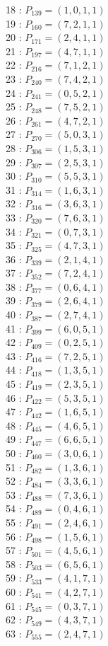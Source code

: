 \documentclass{article}
\begin{document}
{\begin{multicols}{2}
18 : $P_{139}=( 1, 0, 1, 1 )$\\
19 : $P_{160}=( 7, 2, 1, 1 )$\\
20 : $P_{171}=( 2, 4, 1, 1 )$\\
21 : $P_{197}=( 4, 7, 1, 1 )$\\
22 : $P_{216}=( 7, 1, 2, 1 )$\\
23 : $P_{240}=( 7, 4, 2, 1 )$\\
24 : $P_{241}=( 0, 5, 2, 1 )$\\
25 : $P_{248}=( 7, 5, 2, 1 )$\\
26 : $P_{261}=( 4, 7, 2, 1 )$\\
27 : $P_{270}=( 5, 0, 3, 1 )$\\
28 : $P_{306}=( 1, 5, 3, 1 )$\\
29 : $P_{307}=( 2, 5, 3, 1 )$\\
30 : $P_{310}=( 5, 5, 3, 1 )$\\
31 : $P_{314}=( 1, 6, 3, 1 )$\\
32 : $P_{316}=( 3, 6, 3, 1 )$\\
33 : $P_{320}=( 7, 6, 3, 1 )$\\
34 : $P_{321}=( 0, 7, 3, 1 )$\\
35 : $P_{325}=( 4, 7, 3, 1 )$\\
36 : $P_{339}=( 2, 1, 4, 1 )$\\
37 : $P_{352}=( 7, 2, 4, 1 )$\\
38 : $P_{377}=( 0, 6, 4, 1 )$\\
39 : $P_{379}=( 2, 6, 4, 1 )$\\
40 : $P_{387}=( 2, 7, 4, 1 )$\\
41 : $P_{399}=( 6, 0, 5, 1 )$\\
42 : $P_{409}=( 0, 2, 5, 1 )$\\
43 : $P_{416}=( 7, 2, 5, 1 )$\\
44 : $P_{418}=( 1, 3, 5, 1 )$\\
45 : $P_{419}=( 2, 3, 5, 1 )$\\
46 : $P_{422}=( 5, 3, 5, 1 )$\\
47 : $P_{442}=( 1, 6, 5, 1 )$\\
48 : $P_{445}=( 4, 6, 5, 1 )$\\
49 : $P_{447}=( 6, 6, 5, 1 )$\\
50 : $P_{460}=( 3, 0, 6, 1 )$\\
51 : $P_{482}=( 1, 3, 6, 1 )$\\
52 : $P_{484}=( 3, 3, 6, 1 )$\\
53 : $P_{488}=( 7, 3, 6, 1 )$\\
54 : $P_{489}=( 0, 4, 6, 1 )$\\
55 : $P_{491}=( 2, 4, 6, 1 )$\\
56 : $P_{498}=( 1, 5, 6, 1 )$\\
57 : $P_{501}=( 4, 5, 6, 1 )$\\
58 : $P_{503}=( 6, 5, 6, 1 )$\\
59 : $P_{533}=( 4, 1, 7, 1 )$\\
60 : $P_{541}=( 4, 2, 7, 1 )$\\
61 : $P_{545}=( 0, 3, 7, 1 )$\\
62 : $P_{549}=( 4, 3, 7, 1 )$\\
63 : $P_{555}=( 2, 4, 7, 1 )$\\
\end{multicols}
}
\end{document}
